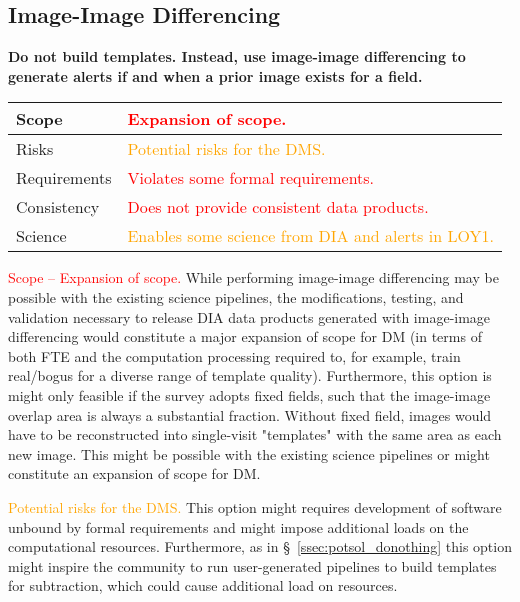 \documentclass[DM,lsstdraft,toc]{lsstdoc}
\begin{document}
\clearpage
\subsection{Image-Image Differencing}\label{ssec:potsol_imgimg}

{\bf Do not build templates. Instead, use image-image differencing to generate alerts if and when a prior image exists for a field.}

\begin{center}
\begin{tabular}{|p{2.5cm}|p{13cm}|}
\hline
Scope & \textcolor{red}{Expansion of scope.} \\
\hline
Risks & \textcolor{orange}{Potential risks for the DMS.} \\
\hline
Requirements & \textcolor{red}{Violates some formal requirements.} \\
\hline
Consistency & \textcolor{red}{Does not provide consistent data products.} \\
\hline
Science & \textcolor{orange}{Enables some science from DIA and alerts in LOY1.} \\
\hline
\end{tabular}
\end{center}

\textcolor{red}{ Scope -- Expansion of scope.}  While performing image-image differencing may be possible with the existing science pipelines, the modifications, testing, and validation necessary to release DIA data products generated with image-image differencing would constitute a major expansion of scope for DM (in terms of both FTE and the computation processing required to, for example, train real/bogus for a diverse range of template quality). Furthermore, this option is might only feasible if the survey adopts fixed fields, such that the image-image overlap area is always a substantial fraction. Without fixed field, images would have to be reconstructed into single-visit "templates" with the same area as each new image. This might be possible with the existing science pipelines or might constitute an expansion of scope for DM.

\textcolor{orange}{ Potential risks for the DMS.} This option might requires development of software unbound by formal requirements and might impose additional loads on the computational resources. Furthermore, as in \S~\ref{ssec:potsol_donothing} this option might inspire the community to run user-generated pipelines to build templates for subtraction, which could cause additional load on resources.
\end{document}
